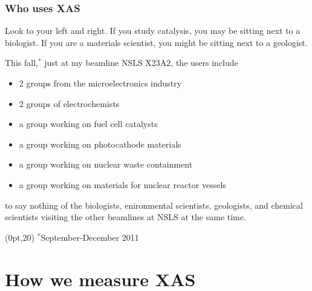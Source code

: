 \documentclass[10pt, xcolor=x11names, compress]{beamer}
\begin{document}
\begin{frame}
  \frametitle{Who uses XAS}
  Look to your left and right.  If you study catalysis, you may be
  sitting next to a biologist.  If you are a materials scientist, you
  might be sitting next to a geologist.

  \begin{block}{This fall,$^\ast$ just at my beamline NSLS X23A2, the users include}
    \begin{itemize}
    \item 2 groups from the microelectronics industry
    \item 2 groups of electrochemists
    \item a group working on fuel cell catalysts
    \item a group working on photocathode materials
    \item a group working on nuclear waste containment
    \item a group working on materials for nuclear reactor vessels
    \end{itemize}
  \end{block}

  to say nothing of the biologists, enironmental scientists,
  geologists, and chemical scientists visiting the other beamlines at
  NSLS at the same time.

  \begin{textblock*}{0.5\linewidth}(0pt,20\TPVertModule) 
    \tiny
    $^\ast$September-December 2011
  \end{textblock*}
\end{frame}

\section{How we measure XAS}
\end{document}
